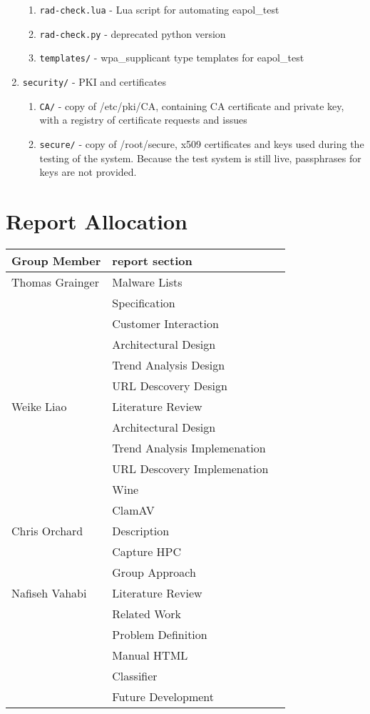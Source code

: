 \begin{enumerate}
\begin{enumerate}
 \item\texttt{rad-check.lua} - Lua script for automating eapol\_test
 \item\texttt{rad-check.py} - deprecated python version
 \item\texttt{templates/} - wpa\_supplicant type templates for eapol\_test
\end{enumerate}
\item\texttt{security/} - PKI and certificates
\begin{enumerate}
 \item\texttt{CA/} - copy of /etc/pki/CA, containing CA certificate and private key,
                with a registry of certificate requests and issues 
 \item\texttt{secure/} - copy of /root/secure, x509 certificates and keys used during
                the testing of the system. Because the test system is still
                live, passphrases for keys are not provided.
\end{enumerate}
\end{enumerate}

\clearpage
\section{Report Allocation}
\label{sec:words}
\begin{center}
\begin{tabularx}{\linewidth}{|XXX|}
\hline
Group Member & report section\\ \hline
Thomas Grainger & Malware Lists\\
& Specification\\
& Customer Interaction\\
& Architectural Design\\
& Trend Analysis Design\\
& URL Descovery Design\\ \hline

Weike Liao & Literature Review \\
& Architectural Design \\
& Trend Analysis Implemenation \\
& URL Descovery Implemenation \\
& Wine \\
& ClamAV \\ \hline

Chris Orchard & Description \\
& Capture HPC \\
& Group Approach \\ \hline

Nafiseh Vahabi & Literature Review  \\
& Related Work \\
& Problem Definition \\
& Manual HTML \\
& Classifier \\
& Future Development \\ \hline
\hline
\end{tabularx}
\end{center}